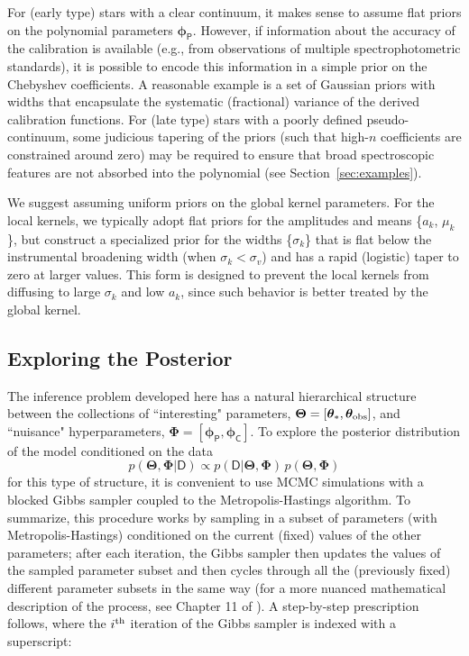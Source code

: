 \documentclass[iop,floatfix,twocolappendix]{emulateapj}
\newcommand{\vD}{\mathsf{D}}
\newcommand{\vt}{ {\bm \theta}}
\newcommand{\vT}{ {\bm \Theta}}
\newcommand{\vp}{ {\bm \phi}}
\newcommand{\vP}{ {\bm \Phi}}
\newcommand{\cheb}{ \vp_{\mathsf{P}}}
\newcommand{\cov}{ \vp_{\mathsf{C}}}
\begin{document}
For (early type) stars with a clear continuum, it makes sense to assume flat priors on the 
polynomial parameters $\cheb$.  However, if information about the accuracy of the calibration is 
available (e.g., from observations of multiple spectrophotometric standards), it is possible to 
encode this information in a simple prior on the Chebyshev coefficients.  A reasonable example is a 
set of Gaussian priors with widths that encapsulate the systematic (fractional) variance of the 
derived calibration functions.  For (late type) stars with a poorly defined pseudo-continuum, 
some judicious tapering of the priors (such that high-$n$ coefficients are constrained around zero) 
may be required to ensure that broad spectroscopic features are not absorbed into the polynomial 
(see Section~\ref{sec:examples}). 

We suggest assuming uniform priors on the global kernel parameters.  For the local kernels, we 
typically adopt flat priors for the amplitudes and means \{$a_k$, $\mu_k$\}, but construct a 
specialized prior for the widths \{$\sigma_k$\} that is flat below the instrumental broadening 
width (when $\sigma_k < \sigma_v$) and has a rapid (logistic) taper to zero at larger values.  This 
form is designed to prevent the local kernels from diffusing to large $\sigma_k$ and low $a_k$,
since such behavior is better treated by the global kernel.  


\subsection{Exploring the Posterior} \label{subsec:MCMC}

The inference problem developed here has a natural hierarchical structure between the collections 
of ``interesting" parameters, $\vT = [\vt_{\ast}, \vt_{\rm obs}]$, and ``nuisance" hyperparameters, 
$\vP = [\cheb, \cov]$.  To explore the posterior distribution of the model conditioned on the data
\begin{equation} \label{eqn:post}
p(\vT, \vP | \vD) \propto p(\vD | \vT, \vP) \, p(\vT, \vP)
\end{equation}
for this type of structure, it is convenient to use MCMC simulations with a blocked Gibbs 
sampler coupled to the Metropolis-Hastings algorithm.  To summarize, this procedure works by 
sampling in a subset of parameters (with Metropolis-Hastings) conditioned on the current (fixed) 
values of the other parameters; after each iteration, the Gibbs sampler then updates the values of 
the sampled parameter subset and then cycles through all the (previously fixed) different parameter 
subsets in the same way (for a more nuanced mathematical description of the process, see Chapter 11 
of \citealt{gelman13}).  A step-by-step prescription follows, where the $i^{\rm th}$ 
iteration of the Gibbs sampler is indexed with a superscript: \\
\end{document}
